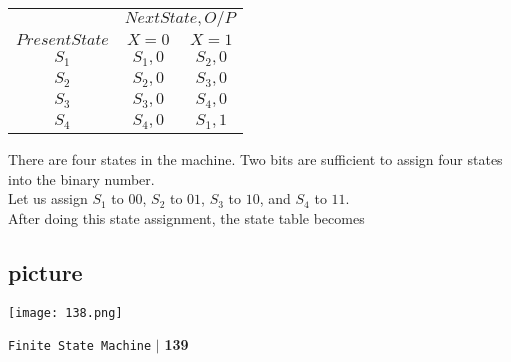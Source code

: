 \documentclass{article}
\begin{document}
\vspace*{0.3cm}
\begin{center}
\begin{tabular}{ccc}
 \hline

 \hline

 \hline

 \hline
 & \multicolumn{2}{c}{$Next State, O/P$}\\
 \cline{2-3}
 $Present State$ &  $X=0$ & $X=1$\\
\hline
 $S_1$    &    $S_1,0$    &   $S_2,0$  \\
 $S_2$    &    $S_2,0$    &   $S_3,0$  \\
 $S_3$    &    $S_3,0$    &   $S_4,0$  \\
 $S_4$    &    $S_4,0$    &   $S_1,1$  \\

 \hline

 \hline

 \hline

 \hline
\end{tabular}
\end{center}

\vspace*{0.3cm}
 \hspace*{0.2cm} There are four states in the machine. Two bits are sufficient to assign four states into the binary
number.\\

\hspace*{0.2cm} Let us assign $S_1$ to $00$, $S_2$ to $01$, $S_3$ to $10$, and $S_4$ to $11$.\\
 \hspace*{0.2cm} After doing this state assignment, the state table becomes\\

\vspace*{0.3cm}
\begin{center}
\section{picture}
\texttt{[image: 138.png]}
\end{center}

\begin{flushright}
\texttt{Finite State Machine} \hspace*{0.10cm}\textbf{$|$} \textbf{139}\hspace*{0.5cm}
\end{flushright}
\end{document}
